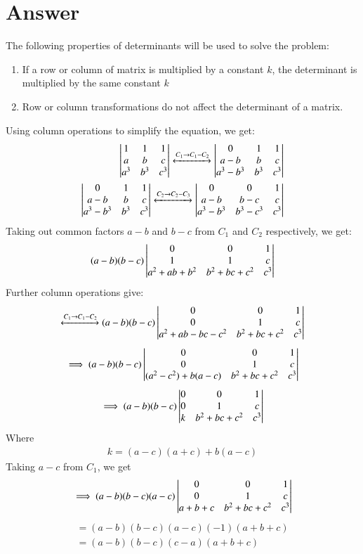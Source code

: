 \documentclass[journal,12pt,twocolumn]{IEEEtran}
\begin{document}
\section{Answer}
The following properties of determinants will be used to solve the problem:
\begin{enumerate}
\item If a row or column of matrix is multiplied by a constant $k$, the determinant is multiplied by the same constant $k$
\item Row or column transformations do not affect the determinant of a matrix.
\end{enumerate}
Using column operations to simplify the equation, we get:
\begin{align}
\begin{vmatrix}1 & 1 & 1\\a & b & c\\a^3 & b^3 & c^3\end{vmatrix} \xleftrightarrow[]{C_1\rightarrow C_1-C_2} \begin{vmatrix}0 & 1 & 1\\a-b & b & c\\a^3-b^3 & b^3 & c^3\end{vmatrix}\\
\begin{vmatrix}0 & 1 & 1\\a-b & b & c\\a^3-b^3 & b^3 & c^3\end{vmatrix} \xleftrightarrow[]{C_2\rightarrow C_2-C_3} \begin{vmatrix}0 & 0 & 1\\a-b & b-c & c\\a^3 - b^3 & b^3 - c^3 & c^3\end{vmatrix}
\end{align}
Taking out common factors $a-b$ and $b-c$ from $C_1$ and $C_2$ respectively, we get:
\begin{align}
(a-b)(b-c)\begin{vmatrix}0 & 0 & 1\\1 & 1 & c\\a^2+ab+b^2 & b^2+bc+c^2 & c^3\end{vmatrix}
\end{align}
Further column operations give:
\begin{align}
 \xleftrightarrow[]{C_1\rightarrow C_1-C_2}(a-b)(b-c)
 \begin{vmatrix}0 & 0 & 1\\0 & 1 & c\\a^2+ab-bc-c^2 & b^2+bc+c^2 & c^3\end{vmatrix}
\end{align}
\begin{align}
\implies (a-b)(b-c)\begin{vmatrix}0 & 0 & 1\\0 & 1 & c\\(a^2-c^2)+b(a-c)& b^2+bc+c^2 & c^3\end{vmatrix}
\end{align}
\begin{align}
\implies (a-b)(b-c)
\begin{vmatrix}0 & 0 & 1\\0 & 1 & c\\k & b^2+bc+c^2 & c^3\end{vmatrix}
\end{align}
Where 
\begin{align}
k = (a-c)(a+c)+b(a-c)
\end{align}
Taking $a-c$ from $C_1$, we get
\begin{align}
\implies (a-b)(b-c)(a-c) \begin{vmatrix}0 & 0 & 1\\0 & 1 & c\\a+b+c & b^2+bc+c^2 & c^3\end{vmatrix}
\end{align}
\begin{align}
=(a-b)(b-c)(a-c)(-1)(a+b+c)\\=(a-b)(b-c)(c-a)(a+b+c)
\end{align}
\end{document}
